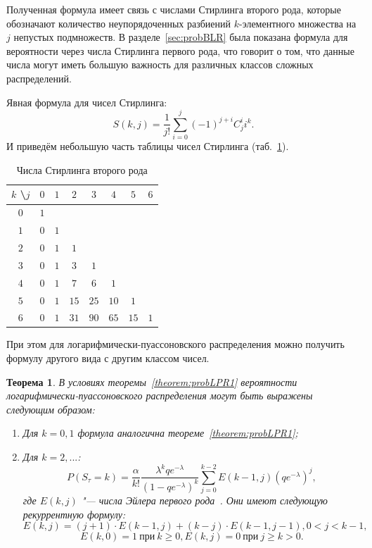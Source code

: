 \documentclass[12pt, specialist, subf, substylefile = spbu_report.rtx]{disser}
\newtheorem{theorem}{Теорема}
\begin{document}
	Полученная формула имеет связь с числами Стирлинга второго рода, которые обозначают количество неупорядоченных разбиений $k$-элементного множества на $j$ непустых подмножеств. В разделе~\ref{sec:probBLR} была показана формула для вероятности через числа Стирлинга первого рода, что говорит о том, что данные числа могут иметь большую важность для различных классов сложных распределений. 
	
	Явная формула для чисел Стирлинга:
	\[
	S(k, j) = \frac {1} {j!} \sum \limits _{i = 0} ^j (-1) ^{j + i} C _{j} ^{i} i ^k.
	\]
	И приведём небольшую часть таблицы чисел Стирлинга (таб.~\ref{tab:stirling2}).
	\begin{table}[!h]
		\centering
		\caption{Числа Стирлинга второго рода}
		\begin{tabular}{c|ccccccc}
			$k$ \textbackslash $j$ & $0$ & $1$ & $2$ & $3$ & $4$ & $5$ & $6$\\ \hline
			$0$ & $1$ &   &  &  & &  &\\
			$1$ & $0$ & $1$ &  &  & &  &\\
			$2$ & $0$ & $1$ & $1$ &  & &  &\\
			$3$ & $0$ & $1$ & $3$ & $1$ &  & &\\
			$4$ & $0$ & $1$ & $7$ &  $6$ & $1$ & & \\
			$5$ & $0$ & $1$ & $15$ & $25$ & $10$ & $1$ & \\
			$6$ & $0$ & $1$ & $31$ & $90$ & $65$ & $15$ & $1$
		\end{tabular}
		\label{tab:stirling2}
	\end{table}
	
	При этом для логарифмически-пуассоновского распределения можно получить формулу другого вида с другим классом чисел.
	
	\begin{theorem}
		\label{theorem:probLPR2}
		В условиях теоремы~\ref{theorem:probLPR1} вероятности логарифмически-пуассоновского распределения могут быть выражены следующим образом:
		\begin{enumerate}
			\item Для $k = 0, 1$ формула аналогична теореме~\ref{theorem:probLPR1};
			
			\item Для $k = 2, ...$:
			\begin{equation}\label{lpr:prob2}
				P(S _\tau = k) = \frac \alpha {k !} \frac {\lambda ^k q e ^{-\lambda}} {\left(1 - q e ^{-\lambda}\right) ^k} \sum \limits _{j = 0} ^{k - 2} E(k - 1, j) \left(q e ^{-\lambda}\right) ^j, 
			\end{equation}
			где $E(k, j)$ "--- числа Эйлера первого рода~\cite{bib:knuth1998}. Они имеют следующую рекуррентную формулу:
			\[
				E(k, j) = (j + 1) \cdot E(k - 1, j) + (k - j) \cdot E(k - 1, j - 1), 0 < j < k - 1,
			\]
			\[
				E(k, 0) = 1~ \text{при}~ k \geqslant 0, E(k, j) = 0~ \text{при}~ j \geqslant k > 0.
			\]
		\end{enumerate}
	\end{theorem}
	
\end{document}
